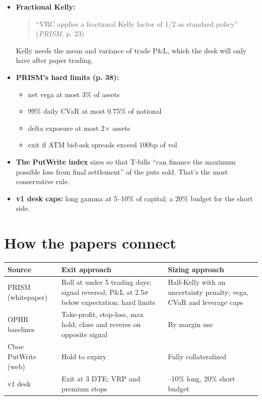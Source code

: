 \documentclass{article}
\begin{document}
\begin{itemize}

\item \textbf{Fractional Kelly:}

\begin{quote}``VRC applies a fractional Kelly factor of 1/\allowbreak{}2 as standard policy'' (\emph{PRISM}, p. 23)\end{quote}

Kelly needs the mean and variance of trade P\&L, which the desk will only have after paper trading.

\item \textbf{PRISM's hard limits (p. 38):}

\begin{itemize}

\item net vega at most 3\% of assets

\item 99\% daily CVaR at most 0.75\% of notional

\item delta exposure at most 2\ensuremath{\times} assets

\item exit if ATM bid-ask spreads exceed 100bp of vol

\end{itemize}

\item \textbf{The PutWrite index} sizes so that T-bills ``can finance the maximum possible loss from final settlement'' of the puts sold. That's the most conservative rule.

\item \textbf{v1 desk caps:} long gamma at 5--10\% of capital; a 20\% budget for the short side.

\end{itemize}

\section{How the papers connect}

\begin{center}\small
\begin{tabularx}{\linewidth}{>{\raggedright\arraybackslash}X >{\raggedright\arraybackslash}X >{\raggedright\arraybackslash}X}
\toprule
\textbf{Source} & \textbf{Exit approach} & \textbf{Sizing approach} \\
\midrule
PRISM (whitepaper) & Roll at under 5 trading days; signal reversal; P\&L at 2.5\ensuremath{\sigma} below expectation; hard limits & Half-Kelly with an uncertainty penalty; vega, CVaR and leverage caps \\
OPHR baselines & Take-profit, stop-loss, max hold; close and reverse on opposite signal & By margin use \\
Cboe PutWrite (web) & Hold to expiry & Fully collateralized \\
v1 desk & Exit at 3 DTE; VRP and premium stops & 5--10\% long, 20\% short budget \\
\bottomrule
\end{tabularx}
\end{center}
\end{document}
